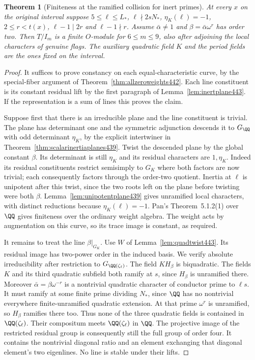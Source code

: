 \documentclass[a4paper,11pt]{article}
\newtheorem{theorem}[proposition]{Theorem}
\theoremstyle{definition}
\theoremstyle{remark}
\numberwithin{equation}{section}
\begin{document}
\begin{theorem}[Finiteness at the ramified collision for inert primes]\leavevmode
\label{thm:inertquadratic443}
At every \(x\) on the original interval suppose
\(5\le\ell\le L_*\), \(\ell\nmid 2sN_*\), \(\eta_K(\ell)=-1\),
\(2\le r<t(x)\), \(\ell-1\mid 2r\) and \(\ell-1\nmid r\).
Assume \(\bar\alpha\ne1\) and \(\beta=\bar\alpha\omega^r\)
has order two. Then \(T/I_m\) is a finite \(O\)-module for
\(6\le m\le9\), also after adjoining the local characters of
genuine flags. The auxiliary quadratic field \(K\) and the
period fields are the ones fixed on the interval.
\end{theorem}
\begin{proof}
It suffices to prove constancy on each equal-characteristic
curve, by the special-fiber argument of
Theorem~\ref{thm:allzeroweights442}. Each line constituent is
its constant residual lift by the first paragraph of
Lemma~\ref{lem:inertplane443}. If the representation is a
sum of lines this proves the claim.

Suppose first that there is an irreducible plane and the line
constituent is trivial. The plane has determinant one and the
symmetric adjunction descends it to \(G_\QQ\) with odd
determinant \(\eta_K\), by the explicit intertwiner in
Theorem~\ref{thm:scalarinertiaplanes439}. Twist the descended
plane by the global constant \(\beta\). Its determinant is still
\(\eta_K\) and its residual characters are \(1,\eta_K\).
Indeed its residual constituents restrict semisimply to \(G_K\)
where both factors are now trivial; each consequently factors
through the order-two quotient. Inertia at \(\ell\) is unipotent
after this twist, since the two roots left on the plane before
twisting were both \(\beta\). Lemma~\ref{lem:unipotentplane439}
gives unramified local characters, with distinct reductions
because \(\eta_K(\ell)=-1\). Pan's Theorem~5.1.2(1) over
\(\QQ\) gives finiteness over the ordinary weight algebra.
The weight acts by augmentation on this curve, so its trace
image is constant, as required.~\cite{XI-VIII-VI-pan40}

It remains to treat the line \(\beta|_{G_K}\). Use \(W\) of
Lemma~\ref{lem:quadtwist443}. Its residual image has two-power
order in the induced basis. We verify absolute irreducibility
after restriction to \(G_{\QQ(\zeta_\ell)}\). The field
\(KH_\beta\) is biquadratic. The fields \(K\) and its third
quadratic subfield both ramify at \(s\), since \(H_\beta\)
is unramified there. Moreover \(\bar\alpha=\beta\omega^{-r}\)
is a nontrivial quadratic character of conductor prime to
\(\ell s\). It must ramify at some finite prime dividing \(N_*\),
since \(\QQ\) has no nontrivial everywhere finite-unramified
quadratic extension. At that prime \(\omega^r\) is unramified,
so \(H_\beta\) ramifies there too. Thus none of the three
quadratic fields is contained in \(\QQ(\zeta_\ell)\). Their
compositum meets \(\QQ(\zeta_\ell)\) in \(\QQ\). The projective
image of the restricted residual group is consequently still the
full group of order four. It contains the nontrivial diagonal
ratio and an element exchanging that diagonal element's two
eigenlines. No line is stable under their lifts.


\end{proof}
\end{document}
